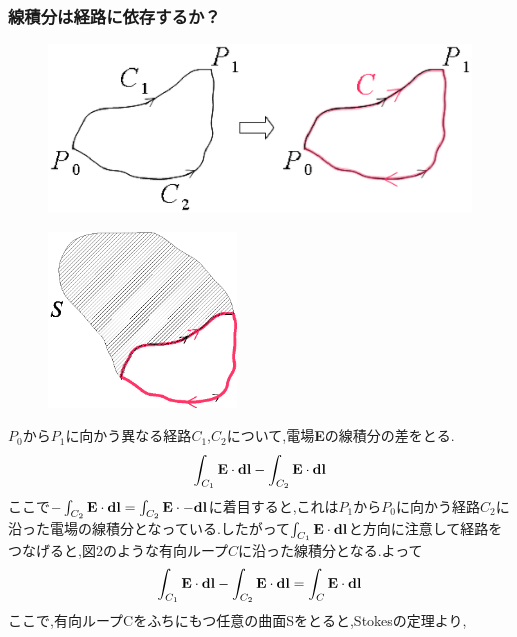 \documentclass[../main]{subfiles}
\begin{document}
\subsubsection{線積分は経路に依存するか？}
\begin{figure}[htbp]
 \begin{center}
  \includegraphics[width=150mm]{5.2.eps}
 \end{center}
 \caption{}
 \label{fig:two}
\end{figure}
\begin{figure}[htbp]
 \begin{center}
  \includegraphics[width=50mm]{5.3.eps}
 \end{center}
 \caption{}
 \label{fig:three}
\end{figure}
$P_0$から$P_1$に向かう異なる経路$C_1$,$C_2$について,電場{\bf E}の線積分の差をとる.
\begin{eqnarray}
\int_{C_1}^{} {\bf E} \cdot {\bf dl} - \int_{C_2}^{} {\bf E} \cdot {\bf dl}
\end{eqnarray}
ここで$- \int_{C_2}^{} {\bf E} \cdot {\bf dl}=\int_{C_2}^{} {\bf E} \cdot {-\bf dl}$に着目すると,これは$P_1$から$P_0$に向かう経路$C_2$に沿った電場の線積分となっている.したがって$\int_{C_1}^{} {\bf E} \cdot {\bf dl}$と方向に注意して経路をつなげると,図2のような有向ループ$C$に沿った線積分となる.よって
\begin{eqnarray}
\int_{C_1}^{} {\bf E} \cdot {\bf dl} - \int_{C_2}^{} {\bf E} \cdot {\bf dl} = \int_{C}^{} {\bf E} \cdot {\bf dl}
\end{eqnarray}
ここで,有向ループCをふちにもつ任意の曲面Sをとると,Stokesの定理より,
\end{document}
